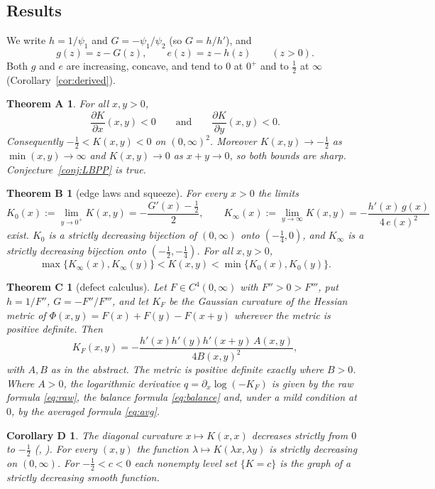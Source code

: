 \documentclass[11pt,a4paper]{article}
\newtheorem*{thmA}{Theorem A}
\newtheorem*{thmB}{Theorem B}
\newtheorem*{thmC}{Theorem C}
\newtheorem*{corD}{Corollary D}
\theoremstyle{definition}
\theoremstyle{remark}
\begin{document}
\subsection{Results}
We write $h=1/\psi_1$ and $G=-\psi_1/\psi_2$ (so $G=h/h'$), and
\[
g(z)=z-G(z),\qquad e(z)=z-h(z)\qquad(z>0).
\]
Both $g$ and $e$ are increasing, concave, and tend to $0$ at $0^+$ and to $\frac12$ at $\infty$ (Corollary~\ref{cor:derived}).

\begin{thmA}
For all $x,y>0$,
\[
\frac{\partial K}{\partial x}(x,y)<0\qquad\text{and}\qquad\frac{\partial K}{\partial y}(x,y)<0 .
\]
Consequently $-\tfrac12<K(x,y)<0$ on $(0,\infty)^2$. Moreover $K(x,y)\to-\tfrac12$ as $\min(x,y)\to\infty$ and $K(x,y)\to0$ as $x+y\to0$, so both bounds are sharp. Conjecture~\ref{conj:LBPP} is true.
\end{thmA}

\begin{thmB}[edge laws and squeeze]
For every $x>0$ the limits
\[
K_0(x):=\lim_{y\to0^+}K(x,y)=-\frac{G'(x)-\frac12}{2},\qquad K_\infty(x):=\lim_{y\to\infty}K(x,y)=-\frac{h'(x)\,g(x)}{4\,e(x)^2}
\]
exist. $K_0$ is a strictly decreasing bijection of $(0,\infty)$ onto $(-\frac14,0)$, and $K_\infty$ is a strictly decreasing bijection onto $(-\frac12,-\frac14)$. For all $x,y>0$,
\[
\max\{K_\infty(x),K_\infty(y)\}<K(x,y)<\min\{K_0(x),K_0(y)\}.
\]
\end{thmB}

\begin{thmC}[defect calculus]
Let $F\in C^4(0,\infty)$ with $F''>0>F'''$, put $h=1/F''$, $G=-F''/F'''$, and let $K_F$ be the Gaussian curvature of the Hessian metric of $\Phi(x,y)=F(x)+F(y)-F(x+y)$ wherever the metric is positive definite. Then
\[
K_F(x,y)=-\frac{h'(x)h'(y)h'(x+y)\,A(x,y)}{4B(x,y)^2},
\]
with $A,B$ as in the abstract. The metric is positive definite exactly where $B>0$. Where $A>0$, the logarithmic derivative $q=\partial_x\log(-K_F)$ is given by the raw formula \eqref{eq:raw}, the balance formula \eqref{eq:balance} and, under a mild condition at $0$, by the averaged formula \eqref{eq:avg}.
\end{thmC}

\begin{corD}
The diagonal curvature $x\mapsto K(x,x)$ decreases strictly from $0$ to $-\frac12$ (\cite{Qi26}, \cite{Qi21,QA24}). For every $(x,y)$ the function $\lambda\mapsto K(\lambda x,\lambda y)$ is strictly decreasing on $(0,\infty)$. For $-\frac12<c<0$ each nonempty level set $\{K=c\}$ is the graph of a strictly decreasing smooth function.
\end{corD}
\end{document}
